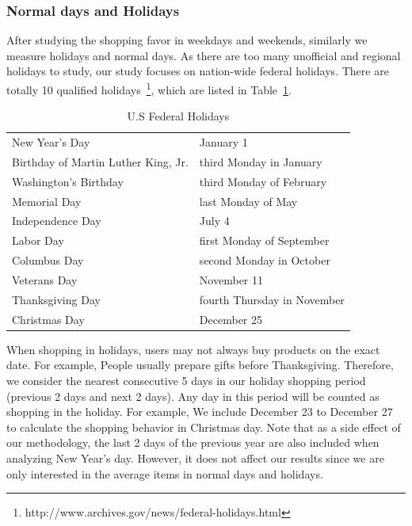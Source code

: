 \subsubsection{Normal days and Holidays}
After studying the shopping favor in weekdays and weekends, similarly we measure holidays and normal days. As there are too many unofficial and regional holidays to study, our study focuses on nation-wide federal holidays. There are totally 10 qualified holidays~\footnote{http://www.archives.gov/news/federal-holidays.html}, which are listed in Table~\ref{tb:holiday}.

\begin{table}[t]
\centering
\caption{U.S Federal Holidays}
\label{tb:holiday}
\begin{adjustbox}{max width=.45\textwidth}
\begin{tabular}{ll}
New Year's Day & January 1  \\
Birthday of Martin Luther King, Jr. & third Monday in January  \\
Washington's Birthday & third Monday of February  \\
Memorial Day & last Monday of May \\
Independence Day & July 4  \\
Labor Day & first Monday of September  \\
Columbus Day & second Monday in October  \\
Veterans Day & November 11  \\
Thanksgiving Day & fourth Thursday in November  \\
Christmas Day & December 25  \\
\end{tabular}
\end{adjustbox}
\end{table}

When shopping in holidays, users may not always buy products on the exact date. For example, People usually prepare gifts before Thanksgiving. Therefore, we consider the nearest consecutive 5 days in our holiday shopping period (previous 2 days and next 2 days). Any day in this period will be counted as shopping in the holiday. For example, We include December 23 to December 27 to calculate the shopping behavior in Christmas day. Note that as a side effect of our methodology, the last 2 days of the previous year are also included when analyzing New Year's day. However, it does not affect our results since we are only interested in the average items in normal days and holidays.

